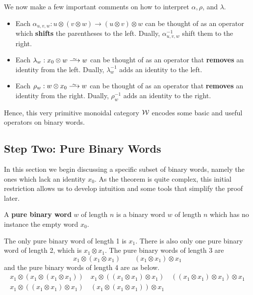 We now make a few important comments on how to interpret $\alpha, \rho$, and $\lambda$.
\begin{itemize}
    \itemsep-0.25em 
    \item Each $\alpha_{u,v,w}: u \otimes (v \otimes w) \to (u \otimes v) \otimes w$ 
    can be thought of as an operator which \textbf{shifts}  the parentheses to the left.
    Dually, $\alpha_{u,v,w}^{-1}$ shift them to the right.
    \item Each $\lambda_w: x_0 \otimes w \isomarrow w$ can be thought of as an operator 
    that \textbf{removes} an identity from the left. Dually, $\lambda_w^{-1}$ adds an identity 
    to the left.
    \item  Each $\rho_w: w  \otimes x_0  \isomarrow w$ can be thought of as an operator 
    that \textbf{removes} an identity from the right. Dually, $\rho^{-1}_w$ adds 
    an identity to the right.
\end{itemize}
Hence, this very primitive monoidal category $\mathcal{W}$ encodes some basic and 
useful operators on binary words.

\newpage
\subsection*{Step Two: Pure Binary Words} 
In this section we begin discussing a specific subset of binary words, namely 
the ones which lack an identity $x_0$.
As the theorem is quite complex, this initial restriction 
allows us to develop intuition and some tools that simplify the proof later.

\begin{definition}
    A \textbf{pure binary word} $w$ of length $n$ is a binary word $w$ of 
    length $n$ which has no instance the empty word $x_0$. 
\end{definition}

\begin{example}
    The only pure binary word of length 1 is $x_1$. 
    There is also only one pure binary word of length 2, which 
    is $x_1 \otimes x_1$.
    The pure binary words of length 3 are 
    \\
    \[
        x_1\otimes (x_1 \otimes x_1)
        \qquad 
        (x_1\otimes x_1) \otimes x_1
    \]
    and the pure binary words of length 4 are as below.
    \begin{gather*}
        x_1\otimes(x_1\otimes (x_1 \otimes x_1))
        \quad 
        x_1\otimes((x_1\otimes x_1) \otimes x_1)
        \quad 
        ((x_1\otimes x_1)\otimes x_1) \otimes x_1
        \\
        x_1\otimes((x_1 \otimes x_1) \otimes x_1)
        \quad 
        (x_1 \otimes (x_1 \otimes x_1))\otimes x_1
    \end{gather*}
\end{example}

